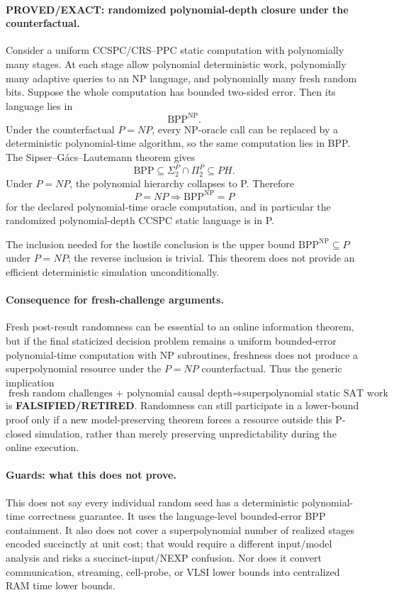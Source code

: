 \documentclass[11pt]{article}
\begin{document}
\paragraph{PROVED/EXACT: randomized polynomial-depth closure under the counterfactual.}
Consider a uniform CCSPC/CRS--PPC static computation with polynomially many stages. At each stage allow
polynomial deterministic work, polynomially many adaptive queries to an NP language, and polynomially
many fresh random bits. Suppose the whole computation has bounded two-sided error. Then its language
lies in
\[
\mathrm{BPP}^{\mathrm{NP}}.
\]
Under the counterfactual \(P=NP\), every NP-oracle call can be replaced by a deterministic polynomial-time
algorithm, so the same computation lies in BPP. The Sipser--G\'acs--Lautemann theorem gives
\[
\mathrm{BPP}\subseteq \Sigma_2^P\cap\Pi_2^P\subseteq PH.
\]
Under \(P=NP\), the polynomial hierarchy collapses to P. Therefore
\[
\boxed{P=NP\Longrightarrow \mathrm{BPP}^{\mathrm{NP}}=P}
\]
for the declared polynomial-time oracle computation, and in particular the randomized polynomial-depth
CCSPC static language is in P.

The inclusion needed for the hostile conclusion is the upper bound
\(\mathrm{BPP}^{\mathrm{NP}}\subseteq P\) under \(P=NP\); the reverse inclusion is trivial. This theorem
does not provide an efficient deterministic simulation unconditionally.

\paragraph{Consequence for fresh-challenge arguments.}
Fresh post-result randomness can be essential to an online information theorem, but if the final
staticized decision problem remains a uniform bounded-error polynomial-time computation with NP
subroutines, freshness does not produce a superpolynomial resource under the \(P=NP\) counterfactual.
Thus the generic implication
\[
\boxed{\text{fresh random challenges + polynomial causal depth}
\Longrightarrow \text{superpolynomial static SAT work}}
\]
is \textbf{FALSIFIED/RETIRED}. Randomness can still participate in a lower-bound proof only if a new
model-preserving theorem forces a resource outside this P-closed simulation, rather than merely
preserving unpredictability during the online execution.

\paragraph{Guards: what this does not prove.}
This does not say every individual random seed has a deterministic polynomial-time correctness
guarantee. It uses the language-level bounded-error BPP containment. It also does not cover a
superpolynomial number of realized stages encoded succinctly at unit cost; that would require a
different input/model analysis and risks a succinct-input/NEXP confusion. Nor does it convert
communication, streaming, cell-probe, or VLSI lower bounds into centralized RAM time lower bounds.
\end{document}
